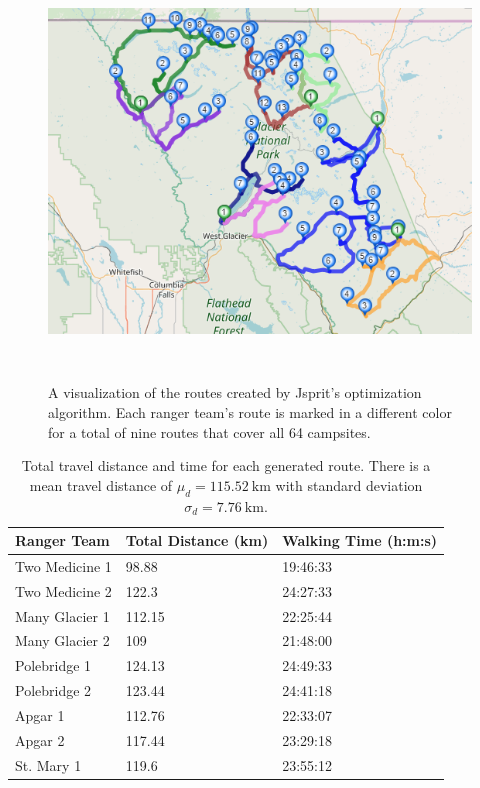 \documentclass[12pt]{article}
\begin{document}
\begin{figure}
    \centering
    \includegraphics[height=11cm]{"Ranger mTSP Visualization 2"}
    \caption{A visualization of the routes created by Jsprit's optimization algorithm. Each ranger team's route is marked in a different color for a total of nine routes that cover all 64 campsites.}
    \label{fig:routeMap}
\end{figure}

\begin{table}
\caption{Total travel distance and time for each generated route. There is a mean travel distance of $\mu_d = \SI{115.52}{\kilo\meter}$ with standard deviation $\sigma_d = \SI{7.76}{\kilo\meter}$.}
\begin{tabular}{@{}lll@{}}
\toprule
Ranger Team    & Total Distance (km) & Walking Time (h:m:s) \\ \midrule
Two Medicine 1 & 98.88               & 19:46:33             \\
Two Medicine 2 & 122.3               & 24:27:33             \\
Many Glacier 1 & 112.15              & 22:25:44             \\
Many Glacier 2 & 109                 & 21:48:00             \\
Polebridge 1   & 124.13              & 24:49:33             \\
Polebridge 2   & 123.44              & 24:41:18             \\
Apgar 1        & 112.76              & 22:33:07             \\
Apgar 2        & 117.44              & 23:29:18             \\
St. Mary 1     & 119.6               & 23:55:12             \\ \bottomrule
\end{tabular}
\label{table:routeSummary}
\end{table}
\end{document}
